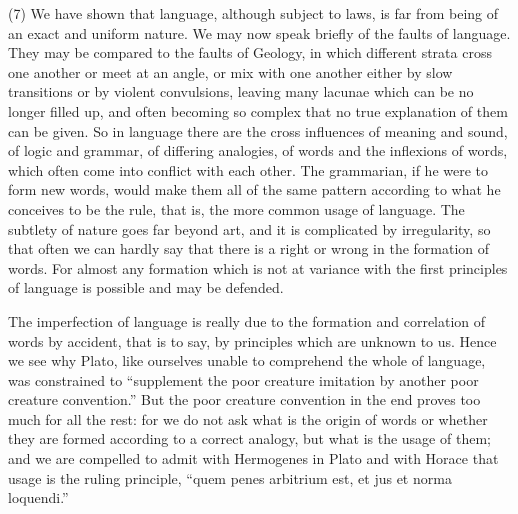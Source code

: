 \documentclass[11pt,letter]{article}
\begin{document}
\par  (7) We have shown that language, although subject to laws, is far from being of an exact and uniform nature. We may now speak briefly of the faults of language. They may be compared to the faults of Geology, in which different strata cross one another or meet at an angle, or mix with one another either by slow transitions or by violent convulsions, leaving many lacunae which can be no longer filled up, and often becoming so complex that no true explanation of them can be given. So in language there are the cross influences of meaning and sound, of logic and grammar, of differing analogies, of words and the inflexions of words, which often come into conflict with each other. The grammarian, if he were to form new words, would make them all of the same pattern according to what he conceives to be the rule, that is, the more common usage of language. The subtlety of nature goes far beyond art, and it is complicated by irregularity, so that often we can hardly say that there is a right or wrong in the formation of words. For almost any formation which is not at variance with the first principles of language is possible and may be defended.

\par  The imperfection of language is really due to the formation and correlation of words by accident, that is to say, by principles which are unknown to us. Hence we see why Plato, like ourselves unable to comprehend the whole of language, was constrained to “supplement the poor creature imitation by another poor creature convention.” But the poor creature convention in the end proves too much for all the rest: for we do not ask what is the origin of words or whether they are formed according to a correct analogy, but what is the usage of them; and we are compelled to admit with Hermogenes in Plato and with Horace that usage is the ruling principle, “quem penes arbitrium est, et jus et norma loquendi.”
\end{document}

